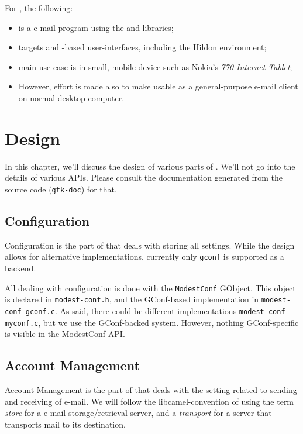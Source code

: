 \documentclass{book}
\begin{document}
For \modest, the following:
\begin{itemize}
  \item \modest is a e-mail program using the \tinymail and \camel libraries;
  \item \modest targets \gtk and \gconf-based user-interfaces, including the Hildon
    environment;
  \item \modest main use-case is in small, mobile device such as Nokia's {\em 770
    Internet Tablet};
  \item However, effort is made also to make \modest usable as a
    general-purpose e-mail client on normal desktop computer.
\end{itemize}





\chapter{Design}
In this chapter, we'll discuss the design of various parts of \modest. We'll
not go into the details of various APIs. Please consult the documentation
generated from the source code ({\tt gtk-doc}) for that.

\section {Configuration}
Configuration is the part of \modest that deals with storing all
settings. While the design allows for alternative implementations, currently
only {\tt gconf} is supported as a backend.

All dealing with configuration is done with the {\tt ModestConf} GObject. This
object is declared in {\tt modest-conf.h}, and the GConf-based implementation in
{\tt modest-conf-gconf.c}. As said, there could be different implementations
{\tt modest-conf-myconf.c}, but we use the GConf-backed system. However,
nothing GConf-specific is visible in the ModestConf API.

\section{Account Management}
Account Management is the part of \modest that deals with the setting related
to sending and receiving of e-mail. We will follow the libcamel-convention of
using the term {\em store} for a e-mail storage/retrieval server, and a {\em
  transport} for a server that transports mail to its destination.
\end{document}
